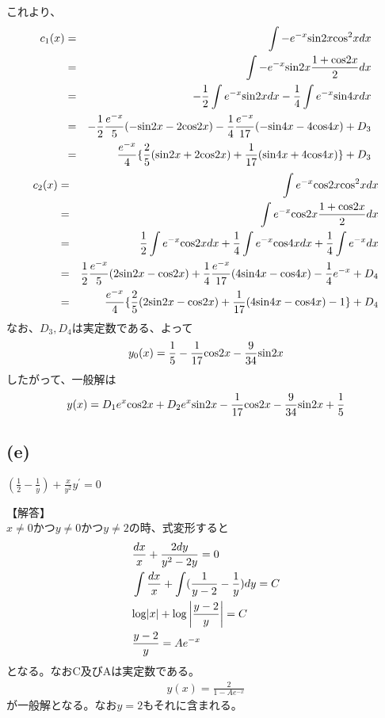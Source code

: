 \documentclass[pdflatex,ja=standard,fleqn]{bxjsarticle}
\begin{document}
これより、
\begin{eqnarray*}
    c_{1}(x)
    &=&\int -e^{-x}{\rm sin}2x{\rm cos^2}xdx\\
    &=&\int -e^{-x}{\rm sin}2x\frac{1+{\rm cos}2x}{2}dx\\ 
    &=&-\frac{1}{2}\int e^{-x}{\rm sin}2xdx-\frac{1}{4}\int e^{-x}{\rm sin}4xdx\\
    &=&-\frac{1}{2}\frac{e^{-x}}{5}(-{\rm sin}2x-2{\rm cos}2x)-\frac{1}{4}\frac{e^{-x}}{17}(-{\rm sin}4x-4{\rm cos}4x)+D_{3}\\
    &=&\frac{e^{-x}}{4}{\lbrace \frac{2}{5}({\rm sin}2x+2{\rm cos}2x)+\frac{1}{17}({\rm sin}4x+4{\rm cos}4x)}\rbrace+D_{3}
\end{eqnarray*}
\begin{eqnarray*}
    c_{2}(x)
    &=&\int e^{-x}{\rm cos}2x{\rm cos^2}xdx\\
    &=&\int e^{-x}{\rm cos}2x\frac{1+{\rm cos}2x}{2}dx\\ 
    &=&\frac{1}{2}\int e^{-x}{\rm cos}2xdx+\frac{1}{4}\int e^{-x}{\rm cos}4xdx+\frac{1}{4}\int e^{-x}dx\\
    &=&\frac{1}{2}\frac{e^{-x}}{5}(2{\rm sin}2x-{\rm cos}2x)+\frac{1}{4}\frac{e^{-x}}{17}(4{\rm sin}4x-{\rm cos}4x)-\frac{1}{4}e^{-x}+D_{4}\\
    &=&\frac{e^{-x}}{4}{\lbrace \frac{2}{5}(2{\rm sin}2x-{\rm cos}2x)+\frac{1}{17}(4{\rm sin}4x-{\rm cos}4x)-1}\rbrace+D_{4}
\end{eqnarray*}
なお、$D_{3},D_{4}$は実定数である、よって
\begin{eqnarray*}
    y_{0}(x)=\frac{1}{5}-\frac{1}{17}{\rm cos}2x-\frac{9}{34}{\rm sin}2x
\end{eqnarray*}
したがって、一般解は
\begin{eqnarray*}
    y(x)=D_{1}e^{x}{\rm cos}2x+D_{2}e^{x}{\rm sin}2x-\frac{1}{17}{\rm cos}2x-\frac{9}{34}{\rm sin}2x+\frac{1}{5}
\end{eqnarray*}
\subsection*{(e)}
\begin{screen}
    $(\frac{1}{2}-\frac{1}{y})+\frac{x}{y^2}y^{\prime}=0$ 
\end{screen}
【解答】\\
$x\ne0$かつ$y\ne0$かつ$y\ne2$の時、式変形すると
\begin{align*}
    &\frac{dx}{x}+\frac{2dy}{y^2-2y}=0\\
    &\int \frac{dx}{x}+\int (\frac{1}{y-2}-\frac{1}{y})dy=C\\
    &{\rm log}|x|+{\rm log}\left|\frac{y-2}{y}\right|=C\\
    &\frac{y-2}{y}=Ae^{-x}
\end{align*}
となる。なおC及びAは実定数である。
\begin{eqnarray*}
    y(x)=\frac{2}{1-Ae^{-x}}
\end{eqnarray*}
が一般解となる。なお$y=2$もそれに含まれる。
\end{document}
